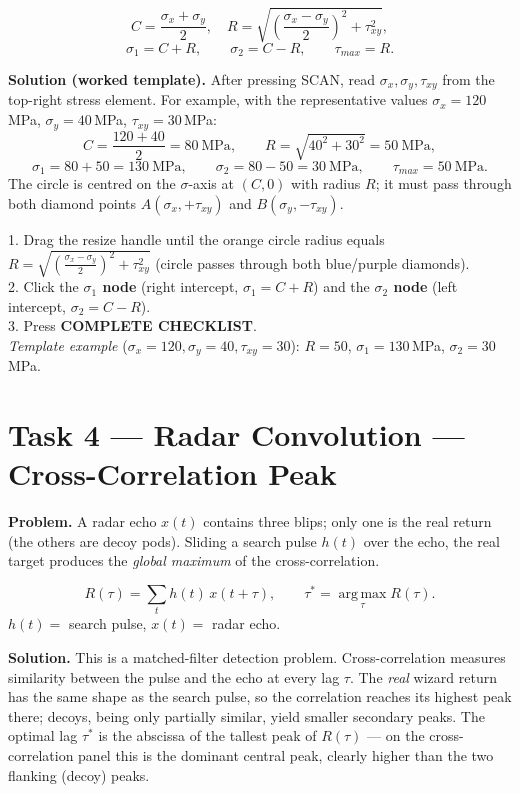 \documentclass[11pt]{article}
\newcommand{\task}[2]{\section{Task #1 --- #2}}
\begin{document}
\begin{relbox}
\[
C=\frac{\sigma_x+\sigma_y}{2},\quad
R=\sqrt{\left(\frac{\sigma_x-\sigma_y}{2}\right)^{2}+\tau_{xy}^{2}},
\]
\[
\sigma_1=C+R,\qquad \sigma_2=C-R,\qquad \tau_{max}=R .
\]
\end{relbox}

\textbf{Solution (worked template).} After pressing SCAN, read
$\sigma_x,\sigma_y,\tau_{xy}$ from the top-right stress element. For example,
with the representative values $\sigma_x=120$\,MPa, $\sigma_y=40$\,MPa,
$\tau_{xy}=30$\,MPa:
\[
C=\frac{120+40}{2}=80\ \text{MPa},\qquad
R=\sqrt{40^{2}+30^{2}}=50\ \text{MPa},
\]
\[
\sigma_1=80+50=130\ \text{MPa},\qquad
\sigma_2=80-50=30\ \text{MPa},\qquad \tau_{max}=50\ \text{MPa}.
\]
The circle is centred on the $\sigma$-axis at $(C,0)$ with radius $R$; it must
pass through both diamond points $A(\sigma_x,+\tau_{xy})$ and
$B(\sigma_y,-\tau_{xy})$.

\begin{answer}
1. Drag the resize handle until the orange circle radius equals
$R=\sqrt{\left(\frac{\sigma_x-\sigma_y}{2}\right)^2+\tau_{xy}^2}$
(circle passes through both blue/purple diamonds).\\
2. Click the \textbf{$\sigma_1$ node} (right intercept, $\sigma_1=C+R$) and the
\textbf{$\sigma_2$ node} (left intercept, $\sigma_2=C-R$).\\
3. Press \textbf{COMPLETE CHECKLIST}.\\
\textit{Template example} ($\sigma_x{=}120,\sigma_y{=}40,\tau_{xy}{=}30$):
$R=50$, $\sigma_1=130$\,MPa, $\sigma_2=30$\,MPa.
\end{answer}

\task{4}{Radar Convolution --- Cross-Correlation Peak}
\textbf{Problem.} A radar echo $x(t)$ contains three blips; only one is the
real return (the others are decoy pods). Sliding a search pulse $h(t)$ over the
echo, the real target produces the \emph{global maximum} of the
cross-correlation.

\begin{relbox}
\[
R(\tau)=\sum_t h(t)\,x(t+\tau),\qquad
\tau^{*}=\operatorname*{arg\,max}_{\tau} R(\tau).
\]
$h(t)=$ search pulse, $x(t)=$ radar echo.
\end{relbox}

\textbf{Solution.} This is a matched-filter detection problem. Cross-correlation
measures similarity between the pulse and the echo at every lag $\tau$. The
\emph{real} wizard return has the same shape as the search pulse, so the
correlation reaches its highest peak there; decoys, being only partially
similar, yield smaller secondary peaks. The optimal lag $\tau^{*}$ is the
abscissa of the tallest peak of $R(\tau)$ --- on the cross-correlation panel
this is the dominant central peak, clearly higher than the two flanking
(decoy) peaks.
\end{document}
